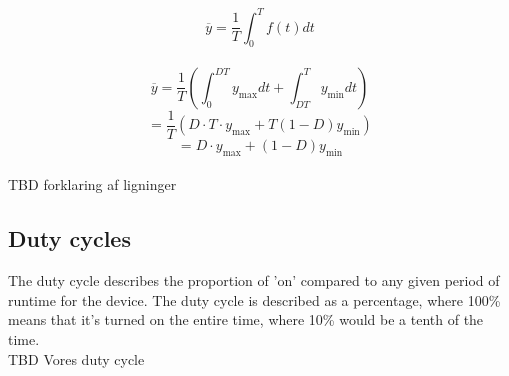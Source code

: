 $$\overline{y}=\frac{1}{T}\int_{0}^{T}f(t)dt$$\\
 
 $$\overline{y}=\frac{1}{T}\left(\int_{0}^{DT}y_\mathrm{max}dt+\int_{DT}^{T}y_\mathrm{min}dt\right)$$
 $$=\frac{1}{T}\left(D \cdot T \cdot y_\mathrm{max}+T(1-D)y_\mathrm{min}\right)$$
 $$=D \cdot y_\mathrm{max}+\left(1-D\right)y_\mathrm{min}$$\\
 
 TBD forklaring af ligninger

\subsection{Duty cycles}
 The duty cycle describes the proportion of 'on' compared to any given period of runtime for the device. The duty cycle is described as a percentage, where 100\% means that it's turned on the entire time, where 10\% would be a tenth of the time.\\
TBD Vores duty cycle\\
 
 
